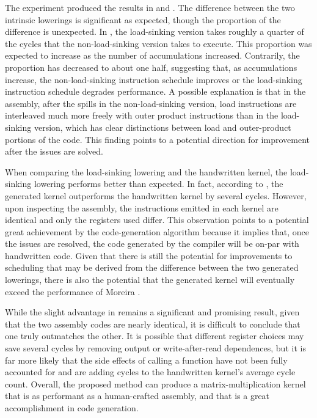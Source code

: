 \documentclass[\main/thesis.tex]{subfiles}
\begin{document}
The experiment produced the results in  and .
The difference between the two \gls{intrinsic} \glspl{lowering} is significant as expected, though the proportion of the difference is unexpected.
In , the load-sinking version takes roughly a quarter of the cycles that the non-load-sinking version takes to execute.
This proportion was expected to increase as the number of accumulations increased.
Contrarily, the proportion has decreased to about one half, suggesting that, as accumulations increase, the non-load-sinking instruction schedule improves or the load-sinking instruction schedule degrades performance.
A possible explanation is that in the assembly, after the \glspl{spill} in the non-load-sinking version, load instructions are interleaved much more freely with outer product instructions than in the load-sinking version, which has clear distinctions between load and outer-product portions of the code.
This finding points to a potential direction for improvement after the  issues are solved.

When comparing the load-sinking \gls{lowering} and the handwritten kernel, the load-sinking \gls{lowering} performs better than expected.
In fact, according to , the generated kernel outperforms the handwritten kernel by several cycles.
However, upon inspecting the assembly, the instructions emitted in each kernel are identical and only the registers used differ.
This observation points to a potential great achievement by the code-generation algorithm because it implies that, once the  issues are resolved, the code generated by the compiler will be on-par with handwritten code.
Given that there is still the potential for improvements to scheduling that may be derived from the difference between the two generated \glspl{lowering}, there is also the potential that the generated kernel will eventually exceed the performance of Moreira \etal.

While the slight advantage in  remains a significant and promising result, given that the two assembly codes are nearly identical, it is difficult to conclude that one truly outmatches the other.
It is possible that different register choices may save several cycles by removing output or write-after-read dependences, but it is far more likely that the side effects of calling a function have not been fully accounted for and are adding cycles to the handwritten kernel's average cycle count.
Overall, the proposed method can produce a matrix-multiplication kernel that is as performant as a human-crafted assembly, and that is a great accomplishment in code generation.
\end{document}

